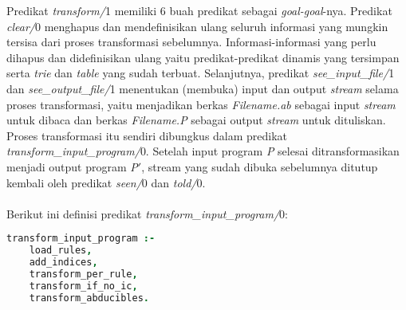 Predikat \textit{transform/}1 memiliki 6 buah predikat sebagai \textit{goal-goal}-nya. Predikat \textit{clear/}0 menghapus dan mendefinisikan ulang seluruh informasi yang mungkin tersisa dari proses transformasi sebelumnya. Informasi-informasi yang perlu dihapus dan didefinisikan ulang yaitu predikat-predikat dinamis yang tersimpan serta \textit{trie} dan \textit{table} yang sudah terbuat. Selanjutnya, predikat \textit{see\_input\_file/}1 dan \textit{see\_output\_file/}1 menentukan (membuka) input dan output \textit{stream} selama proses transformasi, yaitu menjadikan berkas \textit{Filename.ab} sebagai input \textit{stream} untuk dibaca dan berkas \textit{Filename.P} sebagai output \textit{stream} untuk dituliskan. 
Proses transformasi itu sendiri dibungkus dalam predikat \textit{transform\_input\_program/}0. Setelah input program \textit{P} selesai ditransformasikan menjadi output program \textit{P$'$}, stream yang sudah dibuka sebelumnya ditutup kembali oleh predikat \textit{seen/}0 dan \textit{told/}0.
\\ \\
Berikut ini definisi predikat \textit{transform\_input\_program/}0: \\

\begin{lstlisting}[language=Prolog, caption=Definisi predikat \textit{transform\_input\_program/}0,
tabsize=4,
frame=none,
captionpos=b]
transform_input_program :- 
	load_rules,
	add_indices,
	transform_per_rule,
	transform_if_no_ic,
	transform_abducibles.
\end{lstlisting}

